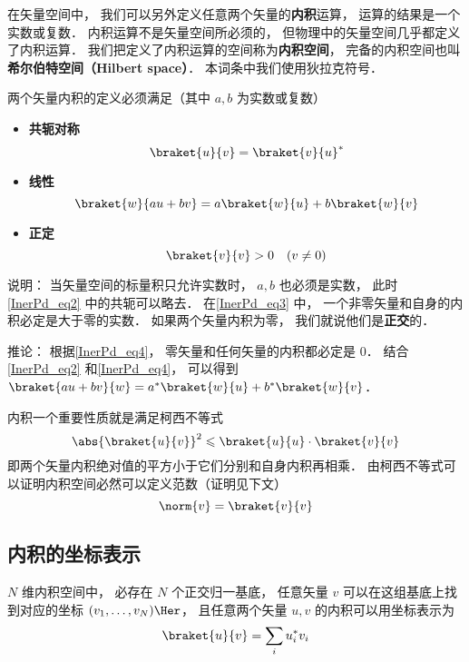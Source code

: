 

在矢量空间中， 我们可以另外定义任意两个矢量的\textbf{内积}运算， 运算的结果是一个实数或复数． 内积运算不是矢量空间所必须的， 但物理中的矢量空间几乎都定义了内积运算． 我们把定义了内积运算的空间称为\textbf{内积空间}， 完备的内积空间也叫\textbf{希尔伯特空间（Hilbert space）}． 本词条中我们使用狄拉克符号．

两个矢量内积的定义必须满足（其中 $a, b$ 为实数或复数）

\begin{itemize}
\item \textbf{共轭对称}
\begin{equation}\label{InerPd_eq2}
\braket{u}{v} = \braket{v}{u}^*
\end{equation}
\item \textbf{线性}
\begin{equation}\label{InerPd_eq4}
\braket{w}{a u + b v} = a\braket{w}{u} + b\braket{w}{v}
\end{equation}
\item \textbf{正定}
\begin{equation}\label{InerPd_eq3}
\braket{v}{v} > 0 \quad (v \ne 0)
\end{equation}
\end{itemize}

说明： 当矢量空间的标量积只允许实数时， $a, b$ 也必须是实数， 此时\autoref{InerPd_eq2} 中的共轭可以略去． 在\autoref{InerPd_eq3} 中， 一个非零矢量和自身的内积必定是大于零的实数． 如果两个矢量内积为零， 我们就说他们是\textbf{正交}的．

推论： 根据\autoref{InerPd_eq4}， 零矢量和任何矢量的内积都必定是 0． 结合\autoref{InerPd_eq2} 和\autoref{InerPd_eq4}， 可以得到 $\braket{a u + b v}{w} = a^*\braket{w}{u} + b^*\braket{w}{v}$．

内积一个重要性质就是满足柯西不等式
\begin{equation}
\abs{\braket{u}{v}}^2 \leqslant \braket{u}{u} \cdot \braket{v}{v}
\end{equation}
即两个矢量内积绝对值的平方小于它们分别和自身内积再相乘． 由柯西不等式可以证明内积空间必然可以定义范数（证明见下文）
\begin{equation}
\norm{v} = \braket{v}{v}
\end{equation}

\subsection{内积的坐标表示}
$N$ 维内积空间中， 必存在 $N$ 个正交归一基底， 任意矢量 $v$ 可以在这组基底上找到对应的坐标 $(v_1, \dots, v_N)\Her$， 且任意两个矢量 $u, v$ 的内积可以用坐标表示为
\begin{equation}
\braket{u}{v} = \sum_i u_i^* v_i
\end{equation}

